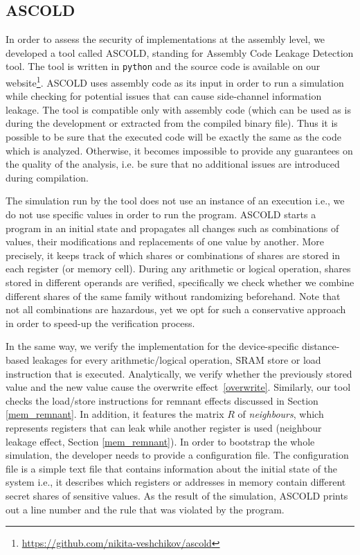 \subsection{ASCOLD}\label{subsec:ascold}

In order to assess the security of implementations at the assembly level, we developed a tool called ASCOLD, standing for Assembly Code Leakage Detection tool.
The tool is written in \texttt{python} and the source code is available on our 
website\footnote{\url{https://github.com/nikita-veshchikov/ascold}}.
ASCOLD uses assembly code as its input in order to run a simulation while checking for potential
issues that can cause side-channel information leakage.
The tool is compatible only with assembly code 
(which can be used as is during the development or extracted from the compiled binary file). 
Thus it is possible to be sure that the executed code will be exactly the same as the code
which is analyzed. Otherwise, it becomes impossible to provide any guarantees
on the quality of the analysis, i.e. be sure that no additional issues are introduced during compilation.

The simulation run by the tool does not use an instance of an execution i.e.,
we do not use specific values in order to run the program.
ASCOLD starts a program in an initial state and propagates all changes
such as combinations of values, their modifications and replacements
of one value by another. More precisely, it keeps track of which shares
or combinations of shares are stored in each register (or memory cell).
During any arithmetic or logical operation, shares stored in different operands
are verified, specifically we check whether we combine different shares of the same family without randomizing beforehand. Note that not all combinations are hazardous, yet we opt for such a conservative approach in order to speed-up the verification process.

In the same way, we verify the implementation for the device-specific distance-based leakages 
for every arithmetic/logical operation, SRAM store or load instruction that is executed. Analytically, we verify whether
the previously stored value and the new value cause the overwrite effect~\ref{overwrite}. Similarly, our tool checks the load/store instructions for remnant effects discussed in Section \ref{mem_remnant}. In addition, it features the matrix $R$ of \emph{neighbours}, which represents registers that can leak while another register is used (neighbour leakage effect, Section \ref{mem_remnant}).
In order to bootstrap the whole simulation, the developer needs to provide
a configuration file. The configuration file is a simple text file that contains information about the initial
state of the system i.e., it describes which registers or addresses in memory contain different secret shares of sensitive values.
As the result of the simulation, ASCOLD prints out a line number and the rule that was violated
by the program.

